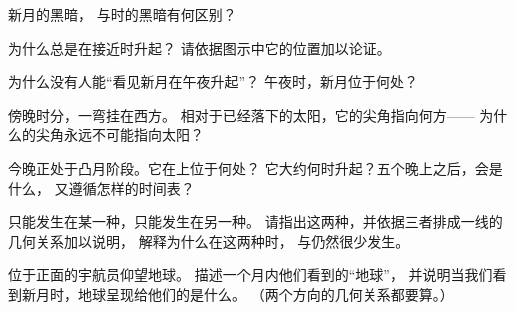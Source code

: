 \begin{exercise}[$\star$]\label{exo:g7:moon-phases:5}
新月的黑暗，
与时的黑暗有何区别？
\end{exercise}

\begin{exercise}[$\star$]\label{exo:g7:moon-phases:6}
为什么总是在接近时升起？
请依据图示中它的位置加以论证。
\end{exercise}

\begin{exercise}[$\star$]\label{exo:g7:moon-phases:7}
为什么没有人能“看见新月在午夜升起”？
午夜时，新月位于何处？
\end{exercise}

\begin{exercise}[$\star$]\label{exo:g7:moon-phases:8}
傍晚时分，一弯挂在西方。
相对于已经落下的太阳，它的尖角指向何方——
为什么的尖角永远不可能指向太阳？
\end{exercise}

\begin{exercise}[$\star\star$]\label{exo:g7:moon-phases:9}
今晚正处于凸月阶段。它在上位于何处？
它大约何时升起？五个晚上之后，会是什么，
又遵循怎样的时间表？
\end{exercise}

\begin{exercise}[$\star\star$]\label{exo:g7:moon-phases:10}
只能发生在某一种，只能发生在另一种。
请指出这两种，并依据三者排成一线的几何关系加以说明，
解释为什么在这两种时，
与仍然很少发生。
\end{exercise}

\begin{exercise}[$\star\star$]\label{exo:g7:moon-phases:11}
位于正面的宇航员仰望地球。
描述一个月内他们看到的“地球”，
并说明当我们看到新月时，地球呈现给他们的是什么。
（两个方向的几何关系都要算。）
\end{exercise}

